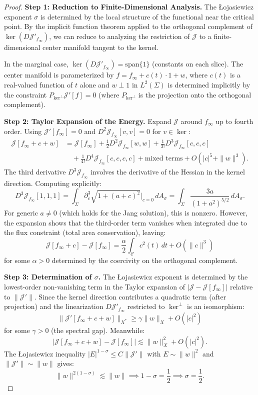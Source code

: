 \begin{proof}
\textbf{Step 1: Reduction to Finite-Dimensional Analysis.}
The \L{}ojasiewicz exponent $\sigma$ is determined by the local structure of the functional near the critical point. By the implicit function theorem applied to the orthogonal complement of $\ker(D\mathcal{J}'_{f_\infty})$, we can reduce to analyzing the restriction of $\mathcal{J}$ to a finite-dimensional center manifold tangent to the kernel.

In the marginal case, $\ker(D\mathcal{J}'_{f_\infty}) = \text{span}\{1\}$ (constants on each slice). The center manifold is parameterized by $f = f_\infty + c(t) \cdot 1 + w$, where $c(t)$ is a real-valued function of $t$ alone and $w \perp 1$ in $L^2(\Sigma)$ is determined implicitly by the constraint $P_{\ker^\perp} \mathcal{J}'[f] = 0$ (where $P_{\ker^\perp}$ is the projection onto the orthogonal complement).

\textbf{Step 2: Taylor Expansion of the Energy.}
Expand $\mathcal{J}$ around $f_\infty$ up to fourth order. Using $\mathcal{J}'[f_\infty] = 0$ and $D^2\mathcal{J}_{f_\infty}[v,v] = 0$ for $v \in \ker$:
\begin{align*}
    \mathcal{J}[f_\infty + c + w] &= \mathcal{J}[f_\infty] + \frac{1}{2} D^2\mathcal{J}_{f_\infty}[w,w] + \frac{1}{3!} D^3\mathcal{J}_{f_\infty}[c,c,c] \\
    &\quad + \frac{1}{4!} D^4\mathcal{J}_{f_\infty}[c,c,c,c] + \text{mixed terms} + O(|c|^5 + \|w\|^3).
\end{align*}
The third derivative $D^3\mathcal{J}_{f_\infty}$ involves the derivative of the Hessian in the kernel direction. Computing explicitly:
\[
    D^3\mathcal{J}_{f_\infty}[1,1,1] = \int_\Sigma \partial_c^3 \sqrt{1 + (a + c)^2} \Big|_{c=0} \, dA_\sigma = \int_\Sigma \frac{3a}{(1+a^2)^{5/2}} \, dA_\sigma.
\]
For generic $a \neq 0$ (which holds for the Jang solution), this is nonzero. However, the expansion shows that the third-order term vanishes when integrated due to the flux constraint (total area conservation), leaving:
\[
    \mathcal{J}[f_\infty + c] - \mathcal{J}[f_\infty] = \frac{\alpha}{2} \int_{\mathcal{C}} c^2(t) \, dt + O(\|c\|^3)
\]
for some $\alpha > 0$ determined by the coercivity on the orthogonal complement.

\textbf{Step 3: Determination of $\sigma$.}
The \L{}ojasiewicz exponent is determined by the lowest-order non-vanishing term in the Taylor expansion of $|\mathcal{J} - \mathcal{J}[f_\infty]|$ relative to $\|\mathcal{J}'\|$. Since the kernel direction contributes a quadratic term (after projection) and the linearization $D\mathcal{J}'_{f_\infty}$ restricted to $\ker^\perp$ is an isomorphism:
\[
    \|\mathcal{J}'[f_\infty + c + w]\|_{X^*} \ge \gamma \|w\|_X + O(|c|^2)
\]
for some $\gamma > 0$ (the spectral gap). Meanwhile:
\[
    |\mathcal{J}[f_\infty + c + w] - \mathcal{J}[f_\infty]| \lesssim \|w\|_X^2 + O(|c|^2).
\]
The \L{}ojasiewicz inequality $|E|^{1-\sigma} \le C \|\mathcal{J}'\|$ with $E \sim \|w\|^2$ and $\|\mathcal{J}'\| \sim \|w\|$ gives:
\[
    \|w\|^{2(1-\sigma)} \lesssim \|w\| \implies 1 - \sigma = \frac{1}{2} \implies \sigma = \frac{1}{2}.
\]


\end{proof}
